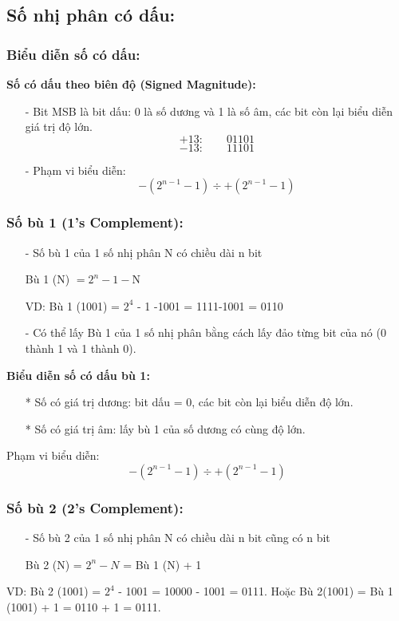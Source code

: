 \subsection{Số nhị phân có dấu:}
\subsubsection{Biểu diễn số có dấu:}
\textbf{Số có dấu theo biên độ (Signed Magnitude):}
\begin{itemize}
    \item[-] Bit MSB là bit dấu: 0 là số dương và 1 là số âm, các bit còn lại biểu diễn giá trị độ lớn.
        \[
            +13: \qquad 01101
        \]
        \[
            -13: \qquad 11101
        \]
    \item[-] Phạm vi biểu diễn:
    \[
        -(2^{n-1} - 1) \div  +(2^{n-1} - 1)
    \]
\end{itemize}
\subsubsection{Số bù 1 (1's Complement):}
\begin{itemize}
    \item[-] Số bù 1 của 1 số nhị phân N có chiều dài n bit
        \begin{center}
            Bù 1 (N) $= 2^n -1 - $N
        \end{center}
        VD: Bù 1 (1001) = $2^4$ - 1 -1001 = 1111-1001 = 0110
    \item[-] Có thể lấy Bù 1 của 1 số nhị phân bằng cách lấy đảo từng bit của nó (0 thành 1 và 1 thành 0).
\end{itemize}
\textbf{Biểu diễn số có dấu bù 1:}
\begin{itemize}
    \item[*] Số có giá trị dương: bit dấu = 0, các bit còn lại biểu diễn độ lớn.
    \item[*] Số có giá trị âm: lấy bù 1 của số dương có cùng độ lớn.
\end{itemize}
Phạm vi biểu diễn:
\[
   -(2^{n-1} - 1) \div  +(2^{n-1} - 1)
\]
\subsubsection{Số bù 2 (2's Complement):}
\begin{itemize}
    \item[-] Số bù 2 của 1 số nhị phân N có chiều dài n bit cũng có n bit
        \begin{center}
            Bù 2 (N) = $2^n - N$ = Bù 1 (N) + 1
        \end{center}
\end{itemize}
VD: Bù 2 (1001) = $2^4$ - 1001 = 10000 - 1001 = 0111. Hoặc Bù 2(1001) = Bù 1 (1001) + 1 = 0110 + 1 = 0111.

